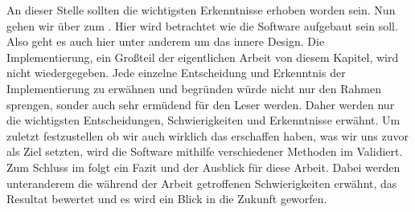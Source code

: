 An dieser Stelle sollten die wichtigsten Erkenntnisse erhoben worden sein. Nun gehen wir über zum . Hier wird betrachtet wie die Software aufgebaut sein soll. Also geht es auch hier unter anderem um das \dq innere Design\dq.\newline%
Die Implementierung, ein Großteil der eigentlichen Arbeit von diesem Kapitel, wird nicht wiedergegeben. Jede einzelne Entscheidung und Erkenntnis der Implementierung zu erwähnen und begründen würde nicht nur den Rahmen sprengen, sonder auch sehr ermüdend für den Leser werden. Daher werden nur die wichtigsten Entscheidungen, Schwierigkeiten und Erkenntnisse erwähnt.\newline%
Um zuletzt festzustellen ob wir auch wirklich das erschaffen haben, was wir uns zuvor als Ziel setzten, wird die Software mithilfe verschiedener Methoden im  Validiert.\newline%
Zum Schluss im  folgt ein Fazit und der Ausblick für diese Arbeit. Dabei werden unteranderem die während der Arbeit getroffenen Schwierigkeiten erwähnt, das Resultat bewertet und es wird ein Blick in die Zukunft geworfen.


